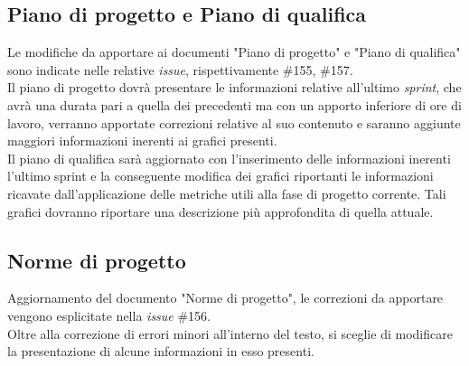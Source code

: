 \subsection{Piano di progetto e Piano di qualifica}
Le modifiche da apportare ai documenti "Piano di progetto" e "Piano di qualifica" sono indicate nelle relative \textit{issue}, rispettivamente \#155, \#157.\\
Il piano di progetto dovrà presentare le informazioni relative all'ultimo \textit{sprint}, che avrà una durata pari a quella dei precedenti ma con un apporto inferiore di ore di lavoro, verranno apportate correzioni relative al suo contenuto e saranno aggiunte maggiori informazioni inerenti ai grafici presenti.\\
Il piano di qualifica sarà aggiornato con l'inserimento delle informazioni inerenti l'ultimo sprint e la conseguente modifica dei grafici riportanti le informazioni ricavate dall'applicazione delle metriche utili alla fase di progetto corrente.
Tali grafici dovranno riportare una descrizione più approfondita di quella attuale.

\subsection{Norme di progetto}
Aggiornamento del documento "Norme di progetto", le correzioni da apportare vengono esplicitate nella \textit{issue} \#156.\\
Oltre alla correzione di errori minori all'interno del testo, si sceglie di modificare la presentazione di alcune informazioni in esso presenti.